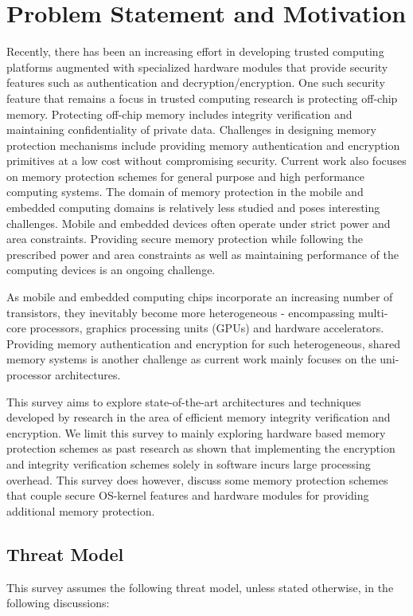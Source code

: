 \section{Problem Statement and Motivation}
\label{sec-introduction}

Recently, there has been an increasing effort in developing trusted computing
platforms augmented with specialized hardware modules that provide security
features such as authentication and decryption/encryption. One such security
feature that remains a focus in trusted computing research is protecting
off-chip memory. Protecting off-chip memory includes integrity verification and
maintaining confidentiality of private data. Challenges in designing memory
protection mechanisms include providing memory authentication and encryption
primitives at a low cost without compromising security. Current work also
focuses on memory protection schemes for general purpose and high performance
computing systems. The domain of memory protection in the mobile and embedded
computing domains is relatively less studied and poses interesting challenges.
Mobile and embedded devices often operate under strict power and area
constraints. Providing secure memory protection while following the prescribed
power and area constraints as well as maintaining performance of the computing
devices is an ongoing challenge.

As mobile and embedded computing chips incorporate an increasing number of
transistors, they inevitably become more heterogeneous - encompassing
multi-core processors, graphics processing units (GPUs) and hardware
accelerators. Providing memory authentication and encryption for such
heterogeneous, shared memory systems is another challenge as current work
mainly focuses on the uni-processor architectures.

This survey aims to explore state-of-the-art architectures and techniques
developed by research in the area of efficient memory integrity verification
and encryption. We limit this survey to mainly exploring hardware based memory
protection schemes as past research as shown that implementing the encryption
and integrity verification schemes solely in software incurs large processing
overhead. This survey does however, discuss some memory protection schemes that
couple secure OS-kernel features and hardware modules for providing additional
memory protection.

\subsection{Threat Model}
This survey assumes the following threat model, unless stated otherwise, in the
following discussions:

